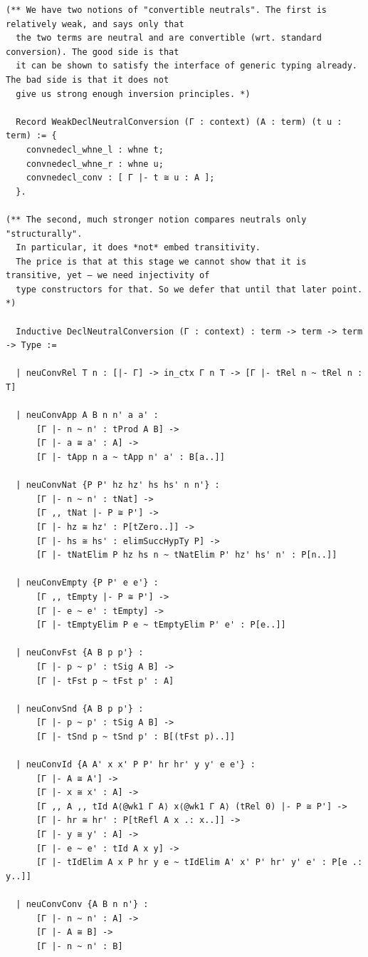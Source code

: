 \begin{lstlisting}
(** We have two notions of "convertible neutrals". The first is relatively weak, and says only that
  the two terms are neutral and are convertible (wrt. standard conversion). The good side is that
  it can be shown to satisfy the interface of generic typing already. The bad side is that it does not
  give us strong enough inversion principles. *)

  Record WeakDeclNeutralConversion (Γ : context) (A : term) (t u : term) := {
    convnedecl_whne_l : whne t;
    convnedecl_whne_r : whne u;
    convnedecl_conv : [ Γ |- t ≅ u : A ];
  }.

(** The second, much stronger notion compares neutrals only "structurally".
  In particular, it does *not* embed transitivity.
  The price is that at this stage we cannot show that it is transitive, yet – we need injectivity of
  type constructors for that. So we defer that until that later point. *)

  Inductive DeclNeutralConversion (Γ : context) : term -> term -> term -> Type :=

  | neuConvRel T n : [|- Γ] -> in_ctx Γ n T -> [Γ |- tRel n ~ tRel n : T]

  | neuConvApp A B n n' a a' :
      [Γ |- n ~ n' : tProd A B] ->
      [Γ |- a ≅ a' : A] ->
      [Γ |- tApp n a ~ tApp n' a' : B[a..]]

  | neuConvNat {P P' hz hz' hs hs' n n'} :
      [Γ |- n ~ n' : tNat] ->
      [Γ ,, tNat |- P ≅ P'] ->
      [Γ |- hz ≅ hz' : P[tZero..]] ->
      [Γ |- hs ≅ hs' : elimSuccHypTy P] ->
      [Γ |- tNatElim P hz hs n ~ tNatElim P' hz' hs' n' : P[n..]]

  | neuConvEmpty {P P' e e'} :
      [Γ ,, tEmpty |- P ≅ P'] ->
      [Γ |- e ~ e' : tEmpty] ->
      [Γ |- tEmptyElim P e ~ tEmptyElim P' e' : P[e..]]

  | neuConvFst {A B p p'} :
      [Γ |- p ~ p' : tSig A B] ->
      [Γ |- tFst p ~ tFst p' : A]

  | neuConvSnd {A B p p'} :
      [Γ |- p ~ p' : tSig A B] ->
      [Γ |- tSnd p ~ tSnd p' : B[(tFst p)..]]

  | neuConvId {A A' x x' P P' hr hr' y y' e e'} :
      [Γ |- A ≅ A'] ->
      [Γ |- x ≅ x' : A] ->
      [Γ ,, A ,, tId A⟨@wk1 Γ A⟩ x⟨@wk1 Γ A⟩ (tRel 0) |- P ≅ P'] ->
      [Γ |- hr ≅ hr' : P[tRefl A x .: x..]] ->
      [Γ |- y ≅ y' : A] ->
      [Γ |- e ~ e' : tId A x y] ->
      [Γ |- tIdElim A x P hr y e ~ tIdElim A' x' P' hr' y' e' : P[e .: y..]]

  | neuConvConv {A B n n'} :
      [Γ |- n ~ n' : A] ->
      [Γ |- A ≅ B] ->
      [Γ |- n ~ n' : B]


\end{lstlisting}
